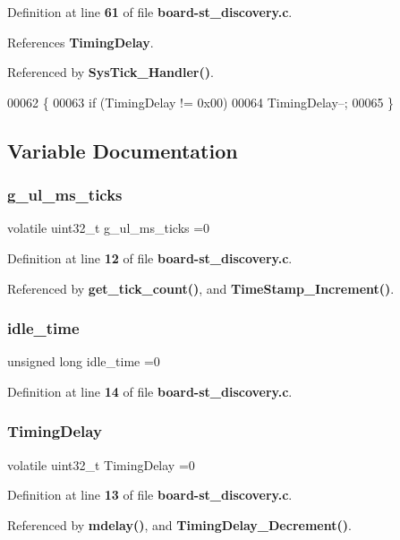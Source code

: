 Definition at line \textbf{ 61} of file \textbf{ board-\/st\+\_\+discovery.\+c}.



References \textbf{ Timing\+Delay}.



Referenced by \textbf{ Sys\+Tick\+\_\+\+Handler()}.


\begin{DoxyCode}
00062 \{
00063     \textcolor{keywordflow}{if} (TimingDelay != 0x00)
00064         TimingDelay--;
00065 \}
\end{DoxyCode}


\subsection{Variable Documentation}
\mbox{\label{board-st__discovery_8c_ae1b4a40a3305fb8f887ee7cdfc208e0c}} 
\subsubsection{g\+\_\+ul\+\_\+ms\+\_\+ticks}
{\footnotesize\ttfamily volatile uint32\+\_\+t g\+\_\+ul\+\_\+ms\+\_\+ticks =0}



Definition at line \textbf{ 12} of file \textbf{ board-\/st\+\_\+discovery.\+c}.



Referenced by \textbf{ get\+\_\+tick\+\_\+count()}, and \textbf{ Time\+Stamp\+\_\+\+Increment()}.

\mbox{\label{board-st__discovery_8c_aa6fa8f11d468f83132b025ce6b06fe92}} 
\subsubsection{idle\+\_\+time}
{\footnotesize\ttfamily unsigned long idle\+\_\+time =0}



Definition at line \textbf{ 14} of file \textbf{ board-\/st\+\_\+discovery.\+c}.

\mbox{\label{board-st__discovery_8c_a556f67f45f371839f1c08be84dd9af50}} 
\subsubsection{Timing\+Delay}
{\footnotesize\ttfamily volatile uint32\+\_\+t Timing\+Delay =0\hspace{0.3cm}{\ttfamily [static]}}



Definition at line \textbf{ 13} of file \textbf{ board-\/st\+\_\+discovery.\+c}.



Referenced by \textbf{ mdelay()}, and \textbf{ Timing\+Delay\+\_\+\+Decrement()}.


